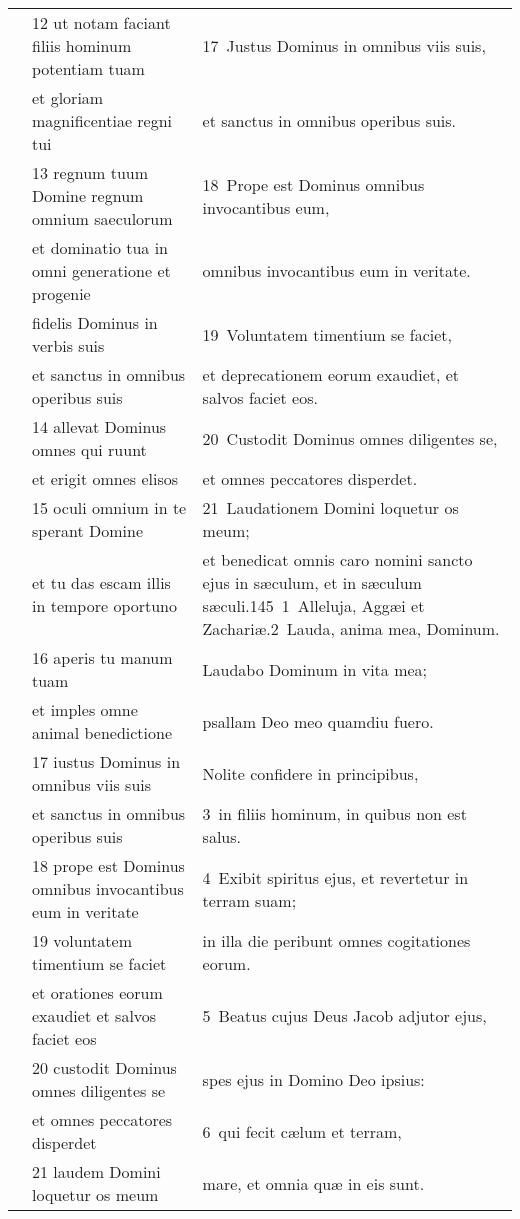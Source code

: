 \documentclass{article}
\begin{document}
\begin{longtable}{@{}p{}p{}p{}@{}}
	&	12 ut notam faciant filiis hominum potentiam tuam	&	17 Justus Dominus in omnibus viis suis,	\\
	&	et gloriam magnificentiae regni tui	&	et sanctus in omnibus operibus suis.	\\
	&	13 regnum tuum Domine regnum omnium saeculorum	&	18 Prope est Dominus omnibus invocantibus eum,	\\
	&	et dominatio tua in omni generatione et progenie	&	omnibus invocantibus eum in veritate.	\\
	&	fidelis Dominus in verbis suis	&	19 Voluntatem timentium se faciet,	\\
	&	et sanctus in omnibus operibus suis	&	et deprecationem eorum exaudiet, et salvos faciet eos.	\\
	&	14 allevat Dominus omnes qui ruunt	&	20 Custodit Dominus omnes diligentes se,	\\
	&	et erigit omnes elisos	&	et omnes peccatores disperdet.	\\
	&	15 oculi omnium in te sperant Domine	&	21 Laudationem Domini loquetur os meum;	\\
	&	et tu das escam illis in tempore oportuno	&	et benedicat omnis caro nomini sancto ejus in sæculum, et in sæculum sæculi.145 1 Alleluja, Aggæi et Zachariæ.2 Lauda, anima mea, Dominum.	\\
	&	16 aperis tu manum tuam	&	Laudabo Dominum in vita mea;	\\
	&	et imples omne animal benedictione	&	psallam Deo meo quamdiu fuero.	\\
	&	17 iustus Dominus in omnibus viis suis	&	Nolite confidere in principibus,	\\
	&	et sanctus in omnibus operibus suis	&	3 in filiis hominum, in quibus non est salus.	\\
	&	18 prope est Dominus omnibus invocantibus eum in veritate	&	4 Exibit spiritus ejus, et revertetur in terram suam;	\\
	&	19 voluntatem timentium se faciet	&	in illa die peribunt omnes cogitationes eorum.	\\
	&	et orationes eorum exaudiet et salvos faciet eos	&	5 Beatus cujus Deus Jacob adjutor ejus,	\\
	&	20 custodit Dominus omnes diligentes se	&	spes ejus in Domino Deo ipsius:	\\
	&	et omnes peccatores disperdet	&	6 qui fecit cælum et terram,	\\
	&	21 laudem Domini loquetur os meum	&	mare, et omnia quæ in eis sunt.	\\

\end{longtable}
\end{document}
